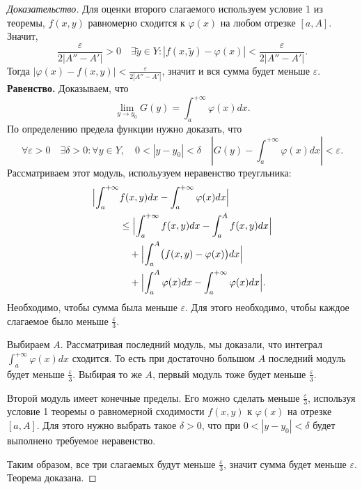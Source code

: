 \documentclass{article}
\theoremstyle{plain}
\theoremstyle{definition}
\theoremstyle{remark}
\begin{document}
\begin{proof}[Доказательство]
Для оценки второго слагаемого используем условие 1 из теоремы, $f(x, y)$ равномерно сходится к $\varphi(x)$ на любом отрезке $[a, A]$. Значит,
\[
\frac{\varepsilon}{2\left|A'' - A'\right|} > 0 \quad \exists \tilde{y} \in Y :
\left| f(x, \tilde{y}) - \varphi(x) \right| < \frac{\varepsilon}{2\left|A'' - A'\right|}.
\]
Тогда $\left|\varphi(x) - f(x, y)\right| < \frac{\varepsilon}{2\left|A'' - A'\right|}$, значит и вся сумма будет меньше $\varepsilon$. \\
\textbf{Равенство.}
Доказываем, что \[\lim_{y \to y_0} G(y) = \int_{a}^{+\infty} \varphi(x)dx.\]
По определению предела функции нужно доказать, что
\[
\forall \varepsilon > 0 \quad \exists \delta > 0 : \forall y \in Y, \quad 0 < |y - y_0| < \delta \quad
\left| G(y) - \int_{a}^{+\infty} \varphi(x)dx \right| < \varepsilon.
\]
Рассматриваем этот модуль, испольузуем неравенство треугльника:
\begin{align*}
\Bigl| \int_{a}^{+\infty} & f(x, y)dx - \int_{a}^{+\infty} \varphi(x)dx \Bigr| \\
&\leq \Bigl| \int_{a}^{+\infty} f(x, y)dx - \int_{a}^{A} f(x, y)dx \Bigr| \\
&\quad + \Bigl| \int_{a}^{A} \bigl(f(x, y) - \varphi(x)\bigr) dx \Bigr| \\
&\quad + \Bigl| \int_{a}^{A} \varphi(x)dx - \int_{a}^{+\infty} \varphi(x)dx \Bigr|.
\end{align*}
Необходимо, чтобы сумма была меньше $\varepsilon$. Для этого необходимо,
чтобы каждое слагаемое было меньше $\frac{\varepsilon}{3}$.

Выбираем $A$. Рассматривая последний модуль, мы доказали, что интеграл $\int_{a}^{+\infty} \varphi(x)dx$ сходится. То есть при достаточно большом $A$ последний модуль будет меньше $\frac{\varepsilon}{3}$.
Выбирая то же $A$, первый модуль тоже будет меньше $\frac{\varepsilon}{3}$.

Второй модуль имеет конечные пределы. Его можно сделать меньше $\frac{\varepsilon}{3}$, используя условие 1 теоремы о равномерной сходимости $f(x, y)$ к $\varphi(x)$ на отрезке $[a, A]$. Для этого нужно выбрать такое $\delta > 0$, что при $0 < |y - y_0| < \delta$ будет выполнено требуемое неравенство.

Таким образом, все три слагаемых будут меньше $\frac{\varepsilon}{3}$, значит сумма будет меньше $\varepsilon$. Теорема доказана.
\end{proof}
\end{document}
